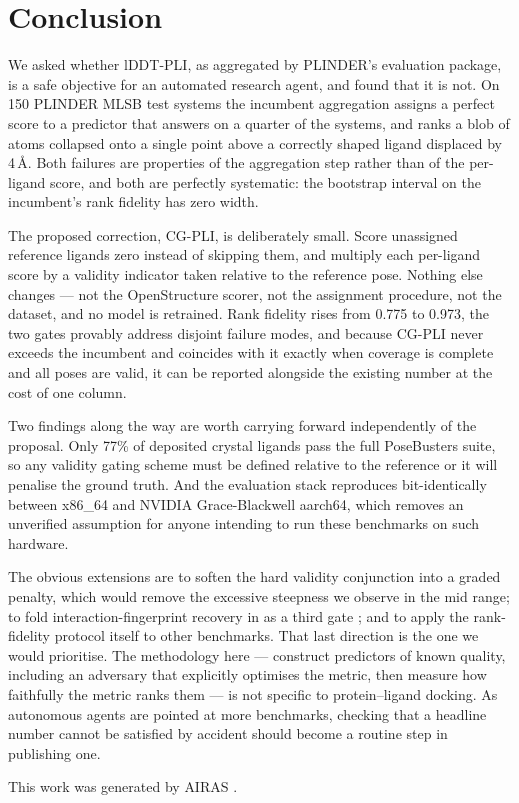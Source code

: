 \documentclass{article} %
\begin{document}
\section{Conclusion}
\label{sec:conclusion}
We asked whether lDDT-PLI, as aggregated by PLINDER's evaluation package, is a safe
objective for an automated research agent, and found that it is not. On 150 PLINDER MLSB
test systems the incumbent aggregation assigns a perfect score to a predictor that
answers on a quarter of the systems, and ranks a blob of atoms collapsed onto a single
point above a correctly shaped ligand displaced by 4\,\AA{}. Both failures are properties
of the aggregation step rather than of the per-ligand score, and both are perfectly
systematic: the bootstrap interval on the incumbent's rank fidelity has zero width.

The proposed correction, CG-PLI, is deliberately small. Score unassigned reference
ligands zero instead of skipping them, and multiply each per-ligand score by a validity
indicator taken relative to the reference pose. Nothing else changes --- not the
OpenStructure scorer, not the assignment procedure, not the dataset, and no model is
retrained. Rank fidelity rises from 0.775 to 0.973, the two gates provably address
disjoint failure modes, and because CG-PLI never exceeds the incumbent and coincides with
it exactly when coverage is complete and all poses are valid, it can be reported
alongside the existing number at the cost of one column.

Two findings along the way are worth carrying forward independently of the proposal.
Only 77\% of deposited crystal ligands pass the full PoseBusters suite, so any validity
gating scheme must be defined relative to the reference or it will penalise the ground
truth. And the evaluation stack reproduces bit-identically between x86\_64 and NVIDIA
Grace-Blackwell aarch64, which removes an unverified assumption for anyone intending to
run these benchmarks on such hardware.

The obvious extensions are to soften the hard validity conjunction into a graded penalty,
which would remove the excessive steepness we observe in the mid range; to fold
interaction-fingerprint recovery in as a third gate \citep{errington-2025-assessing}; and to
apply the rank-fidelity protocol itself to other benchmarks. That last direction is the
one we would prioritise. The methodology here --- construct predictors of known quality,
including an adversary that explicitly optimises the metric, then measure how faithfully
the metric ranks them --- is not specific to protein--ligand docking. As autonomous
agents \citep{tang-2025-researcher,boiko-2023-autonomous} are pointed at more benchmarks,
checking that a headline number cannot be satisfied by accident should become a routine
step in publishing one.

This work was generated by \textsc{AIRAS} \citep{airas2025}.



\end{document}
